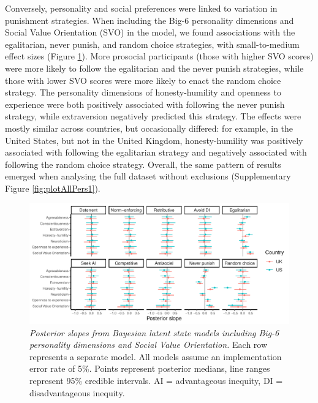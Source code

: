 \documentclass[
  man,floatsintext]{apa6}
\begin{document}
Conversely, personality and social preferences were linked to variation in
punishment strategies. When including the Big-6 personality dimensions and
Social Value Orientation (SVO) in the model, we found associations with the
egalitarian, never punish, and random choice strategies, with small-to-medium
effect sizes (Figure \ref{fig:plotAllPers2}). More prosocial participants
(those with higher SVO scores) were more likely to follow the egalitarian and
the never punish strategies, while those with lower SVO scores were more likely
to enact the random choice strategy. The personality dimensions of
honesty-humility and openness to experience were both positively associated with
following the never punish strategy, while extraversion negatively predicted
this strategy. The effects were mostly similar across countries, but
occasionally differed: for example, in the United States, but not in the United
Kingdom, honesty-humility was positively associated with following the
egalitarian strategy and negatively associated with following the random
choice strategy. Overall, the same pattern of results emerged when analysing the
full dataset without exclusions (Supplementary Figure \ref{fig:plotAllPers1}).







\begin{figure}
\centering
\includegraphics{manuscript_files/figure-latex/plotAllPers2-1.pdf}
\caption{\label{fig:plotAllPers2}\emph{Posterior slopes from Bayesian latent state models
including Big-6 personality dimensions and Social Value Orientation.} Each row
represents a separate model. All models assume an implementation error rate of
5\%. Points represent posterior medians, line ranges represent 95\% credible
intervals. AI = advantageous inequity, DI = disadvantageous inequity.}
\end{figure}
\end{document}
